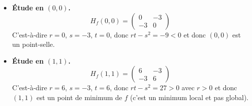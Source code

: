\documentclass[11pt, class=report,crop=false]{standalone}
\begin{document}
\begin{exemple}
\begin{itemize}
	\item \textbf{Étude en $(0,0)$.}     
    $$H_f(0,0) = \begin{pmatrix}0&-3\\-3&0\end{pmatrix}$$
    C'est-à-dire $r=0$, $s=-3$, $t=0$, donc $rt-s^2 = -9 < 0$ et donc $(0,0)$ est un point-selle.
   
	
    \item \textbf{Étude en $(1,1)$.}	
    $$H_f(1,1) = \begin{pmatrix}6&-3\\-3&6\end{pmatrix}$$
    C'est-à-dire $r=6$, $s=-3$, $t=6$, donc $rt-s^2 = 27 > 0$ avec $r>0$ et donc $(1,1)$ est un point de minimum de $f$ (c'est un minimum local et pas global).	
\end{itemize}

\end{exemple}

\bigskip	
\end{document}
